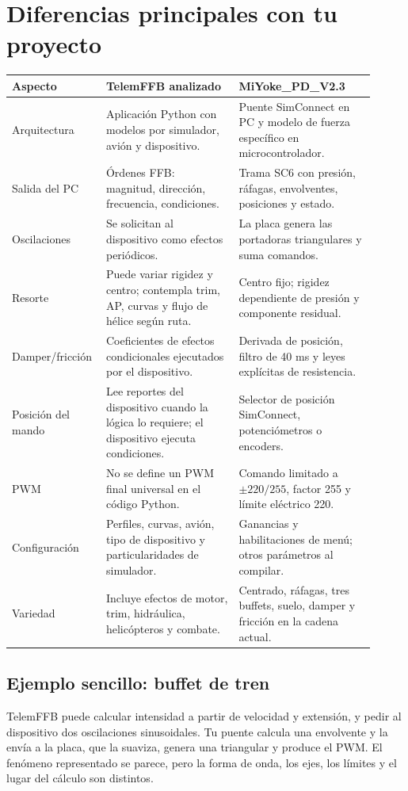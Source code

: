\documentclass[11pt,a4paper]{article}
\begin{document}
\section{Diferencias principales con tu proyecto}
\begin{longtable}{p{0.20\linewidth}p{0.35\linewidth}p{0.36\linewidth}}
\toprule
Aspecto & TelemFFB analizado & MiYoke\_PD\_V2.3\\
\midrule
Arquitectura & Aplicación Python con modelos por simulador, avión y dispositivo. & Puente SimConnect en PC y modelo de fuerza específico en microcontrolador.\\
Salida del PC & Órdenes FFB: magnitud, dirección, frecuencia, condiciones. & Trama SC6 con presión, ráfagas, envolventes, posiciones y estado.\\
Oscilaciones & Se solicitan al dispositivo como efectos periódicos. & La placa genera las portadoras triangulares y suma comandos.\\
Resorte & Puede variar rigidez y centro; contempla trim, AP, curvas y flujo de hélice según ruta. & Centro fijo; rigidez dependiente de presión y componente residual.\\
Damper/fricción & Coeficientes de efectos condicionales ejecutados por el dispositivo. & Derivada de posición, filtro de 40 ms y leyes explícitas de resistencia.\\
Posición del mando & Lee reportes del dispositivo cuando la lógica lo requiere; el dispositivo ejecuta condiciones. & Selector de posición SimConnect, potenciómetros o encoders.\\
PWM & No se define un PWM final universal en el código Python. & Comando limitado a $\pm220/255$, factor 255 y límite eléctrico 220.\\
Configuración & Perfiles, curvas, avión, tipo de dispositivo y particularidades de simulador. & Ganancias y habilitaciones de menú; otros parámetros al compilar.\\
Variedad & Incluye efectos de motor, trim, hidráulica, helicópteros y combate. & Centrado, ráfagas, tres buffets, suelo, damper y fricción en la cadena actual.\\
\bottomrule
\end{longtable}

\subsection{Ejemplo sencillo: buffet de tren}
TelemFFB puede calcular intensidad a partir de velocidad y extensión, y pedir al dispositivo dos oscilaciones sinusoidales. Tu puente calcula una envolvente y la envía a la placa, que la suaviza, genera una triangular y produce el PWM. El fenómeno representado se parece, pero la forma de onda, los ejes, los límites y el lugar del cálculo son distintos.
\end{document}

